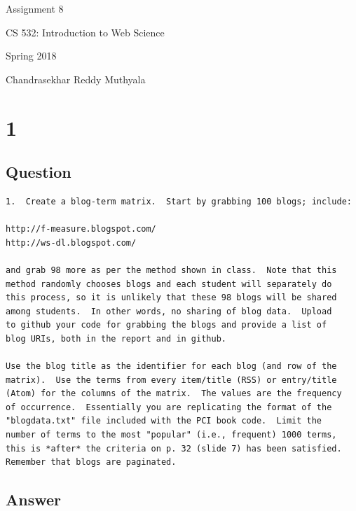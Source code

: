 \documentclass[letterpaper,11pt]{article}
\begin{document}
\begin{titlepage}

\begin{center}

\Huge{Assignment 8}

\Large{CS 532:  Introduction to Web Science}

\Large{Spring 2018}

\Large{Chandrasekhar Reddy Muthyala}


\end{center}

\end{titlepage}

\newpage


\section*{1}

\subsection*{Question}

\begin{verbatim}
1.  Create a blog-term matrix.  Start by grabbing 100 blogs; include:

http://f-measure.blogspot.com/
http://ws-dl.blogspot.com/

and grab 98 more as per the method shown in class.  Note that this
method randomly chooses blogs and each student will separately do
this process, so it is unlikely that these 98 blogs will be shared
among students.  In other words, no sharing of blog data.  Upload
to github your code for grabbing the blogs and provide a list of
blog URIs, both in the report and in github.

Use the blog title as the identifier for each blog (and row of the
matrix).  Use the terms from every item/title (RSS) or entry/title
(Atom) for the columns of the matrix.  The values are the frequency
of occurrence.  Essentially you are replicating the format of the
"blogdata.txt" file included with the PCI book code.  Limit the
number of terms to the most "popular" (i.e., frequent) 1000 terms,
this is *after* the criteria on p. 32 (slide 7) has been satisfied.
Remember that blogs are paginated. 
\end{verbatim}

\clearpage
\subsection*{Answer}
\end{document}
